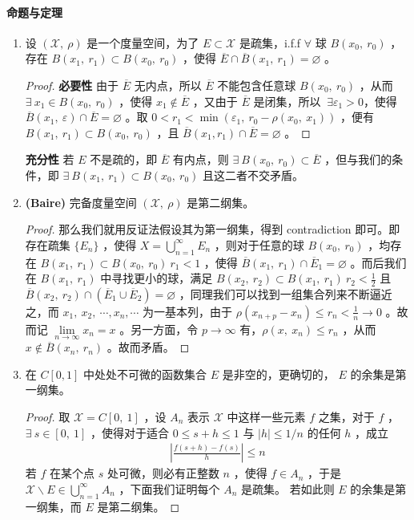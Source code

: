 	\paragraph{命题与定理}
	\begin{enumerate}[leftmargin=2cm, label=\arabic*]
		\item 设 $(\mathscr{X},\ \rho)$ 是一个度量空间，为了 $E\subset\mathscr{X}$ 是疏集，i.f.f $\forall$ 球 $B(x_0,\ r_0)$ ，存在 $B(x_1,\ r_1)\subset B(x_0,\ r_0)$ ，使得 $\overline{E}\cap\overline{B}(x_1,\ r_1) = \varnothing$ 。
		\begin{proof}
			\textbf{必要性} 由于 $\overline{E}$ 无内点，所以 $\overline{E}$ 不能包含任意球 $B(x_0,\ r_0)$ ，从而 $\exists\ x_1\in B(x_0,\ r_0)$ ，使得 $x_1\notin \overline{E}$ ，又由于 $\overline{E}$ 是闭集，所以 $\ \exists \varepsilon_1 >0$，使得 $\overline{B}(x_1,\ \varepsilon)\cap \overline{E} = \varnothing$ 。取 $0 < r_1 < \min(\varepsilon_1,\ r_0 - \rho(x_0,\ x_1))$ ，便有 $B(x_1,\ r_1)\subset B(x_0,\ r_0)$ ，且 $\overline{B}(x_1, r_1)\cap\overline{E} = \varnothing$ 。
		\end{proof}
		\textbf{充分性} 若 $E$ 不是疏的，即 $\overline{E}$ 有内点，则 $\exists\ B(x_0,\ r_0)\subset \overline{E}$ ，但与我们的条件，即 $\exists\ B(x_1,\ r_1)\subset B(x_0,\ r_0)$ 且这二者不交矛盾。 
		\item \textbf{(Baire)} 完备度量空间 $(\mathscr{X},\ \rho)$ 是第二纲集。
		\begin{proof}
			那么我们就用反证法假设其为第一纲集，得到 contradiction 即可。即存在疏集 $\{E_n\}$ ，使得 $X = \bigcup\limits_{n=1}^{\infty} E_n$ ，则对于任意的球 $B(x_0,\ r_0)$ ，均存在 $B(x_1,\ r_1)\subset B(x_0,\ r_0)\ r_1<1$ ，使得 $\overline{B}(x_1,\ r_1)\cap \overline{E}_1 = \varnothing$ 。而后我们在 $B(x_1,\ r_1)$ 中寻找更小的球，满足 $B(x_2,\ r_2)\subset B(x_1,\ r_1)\ r_2<\frac{1}{2}$ 且 $\overline{B}(x_2,\ r_2)\cap \left(\overline{E}_1\cup \overline{E}_2\right) = \varnothing$ ，同理我们可以找到一组集合列来不断逼近之，而 $x_1,\ x_2,\ \cdots, x_n, \cdots$ 为一基本列，由于 $\rho(x_{n+p}-x_n) \leqslant r_n < \frac{1}{n}\to 0$ 。故而记 $\lim\limits_{n\to\infty} x_n = x$ 。另一方面，令 $p\to \infty$ 有，$\rho(x,\ x_n)\leqslant r_n$ ，从而 $x\notin \overline{B}(x_n,\ r_n)$ 。故而矛盾。
		\end{proof}
		\item 在 $C[0,1]$ 中处处不可微的函数集合 $E$ 是非空的，更确切的， $E$ 的余集是第一纲集。
		\begin{proof}
			取 $\mathscr{X}=C[0,\ 1]$ ，设 $A_n$ 表示 $\mathscr{X}$ 中这样一些元素 $f$ 之集，对于 $f$ ，$\exists\ s\in [0,\ 1]$ ，使得对于适合 $0\leqslant s+h\leqslant 1$ 与 $|h|\leqslant 1/n$ 的任何 $h$ ，成立
			\begin{align*}
				\left|\frac{f(s+h) - f(s)}{h} \right| \leqslant n
			\end{align*}
			若 $f$ 在某个点 $s$ 处可微，则必有正整数 $n$ ，使得 $f\in A_n$ ，于是 $\mathscr{X}\backslash E\in \bigcup\limits_{n=1}^{\infty} A_n$ ，下面我们证明每个 $A_n$ 是疏集。 若如此则 $E$ 的余集是第一纲集，而 $E$ 是第二纲集。 
			

\end{proof}
\end{enumerate}
